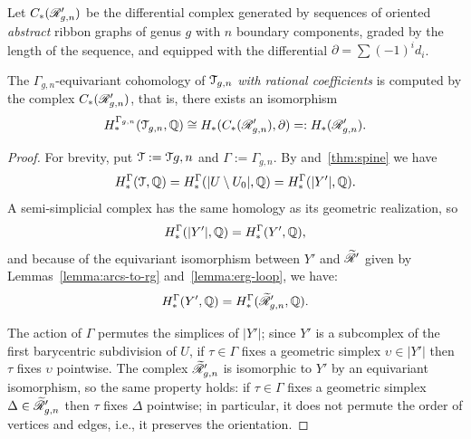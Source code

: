 \begin{lemma}
  \label{lemma:rg-iso1}
  Let $C_*(\mathscr{R}_{g,n}')$ be the differential complex generated by
  sequences of oriented \emph{abstract} ribbon graphs of genus $g$
  with $n$ boundary components, graded by the length of the sequence,
  and equipped with the differential $\partial = \sum (-1)^id_i$.

  The $\Gamma_{g,n}$-equivariant cohomology of $\mathcal{T}_{g,n}$ \emph{with
    rational coefficients} is computed by the complex $C_*(\mathscr{R}_{g,n}')$,
  that is, there exists an isomorphism
  \begin{equation*}
    H^{\Gamma_{g,n}}_*(\mathcal{T}_{g,n}, \mathbb{Q}) \cong H_*(C_*(\mathscr{R}_{g,n}'), \partial) =: H_*(\mathscr{R}_{g,n}').
  \end{equation*}
\end{lemma}
\begin{proof}
  For brevity, put $\mathcal{T} := \mathcal{T}{g,n}$ and $\Gamma := \Gamma_{g,n}$.  By 
  and~\ref{thm:spine} we have
  \begin{equation*}
    H^\Gamma_*(\mathcal{T}, \mathbb{Q}) = H^\Gamma_*(|U \setminus U_0|, \mathbb{Q}) = H^\Gamma_*(|Y'|, \mathbb{Q}).
  \end{equation*}
  A semi-simplicial complex has the same homology as its geometric
  realization, so
  \begin{equation*}
    H^\Gamma_*(|Y'|, \mathbb{Q}) = H^\Gamma_*(Y', \mathbb{Q}),
  \end{equation*}
  and because of the equivariant isomorphism between $Y'$ and $\mathscr{\widetilde R}'$
  given by Lemmas~\ref{lemma:arcs-to-rg} and~\ref{lemma:erg-loop}, we
  have:
  \begin{equation*}
    H^\Gamma_*(Y', \mathbb{Q}) = H^\Gamma_*(\mathscr{\widetilde R}'_{g,n}, \mathbb{Q}).
  \end{equation*}

  The action of $\Gamma$ permutes the simplices of $|Y'|$; since $Y'$ is a
  subcomplex of the first barycentric subdivision of $U$, if $\tau \in \Gamma$
  fixes a geometric simplex $\upsilon \in |Y'|$ then $\tau$ fixes $\upsilon$ pointwise.
  The complex $\mathscr{\widetilde R}'_{g,n}$ is isomorphic to $Y'$ by an equivariant
  isomorphism, so the same property holds: if $\tau \in \Gamma$ fixes a
  geometric simplex $\Delta \in \mathscr{\widetilde R}'_{g,n}$ then $\tau$ fixes $\Delta$ pointwise; in
  particular, it does not permute the order of vertices and edges,
  i.e., it preserves the orientation.


\end{proof}
